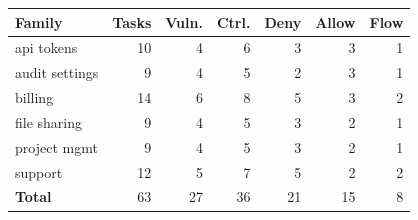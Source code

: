 \scriptsize
\begin{tabular}{@{}lrrrrrr@{}}
\toprule
Family & Tasks & Vuln. & Ctrl. & Deny & Allow & Flow \\
\midrule
api tokens & 10 & 4 & 6 & 3 & 3 & 1 \\
audit settings & 9 & 4 & 5 & 2 & 3 & 1 \\
billing & 14 & 6 & 8 & 5 & 3 & 2 \\
file sharing & 9 & 4 & 5 & 3 & 2 & 1 \\
project mgmt & 9 & 4 & 5 & 3 & 2 & 1 \\
support & 12 & 5 & 7 & 5 & 2 & 2 \\
\midrule
\textbf{Total} & 63 & 27 & 36 & 21 & 15 & 8 \\
\bottomrule
\end{tabular}
